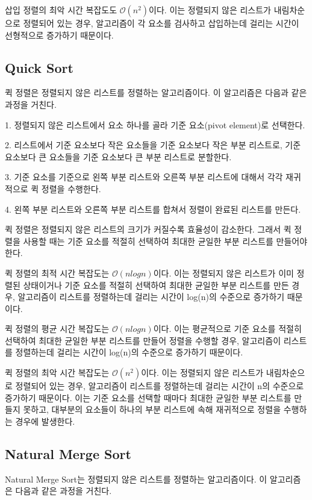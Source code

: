 \documentclass{article}
\begin{document}
삽입 정렬의 최악 시간 복잡도도 $\mathcal{O}(n^2)$이다. 이는 정렬되지 않은 리스트가 내림차순으로 정렬되어 있는 경우, 알고리즘이 각 요소를 검사하고 삽입하는데 걸리는 시간이 선형적으로 증가하기 때문이다.

\subsection{Quick Sort}
퀵 정렬은 정렬되지 않은 리스트를 정렬하는 알고리즘이다. 이 알고리즘은 다음과 같은 과정을 거친다.

1. 정렬되지 않은 리스트에서 요소 하나를 골라 기준 요소(pivot element)로 선택한다.

2. 리스트에서 기준 요소보다 작은 요소들을 기준 요소보다 작은 부분 리스트로, 기준 요소보다 큰 요소들을 기준 요소보다 큰 부분 리스트로 분할한다.

3. 기준 요소를 기준으로 왼쪽 부분 리스트와 오른쪽 부분 리스트에 대해서 각각 재귀적으로 퀵 정렬을 수행한다.

4. 왼쪽 부분 리스트와 오른쪽 부분 리스트를 합쳐서 정렬이 완료된 리스트를 만든다.

퀵 정렬은 정렬되지 않은 리스트의 크기가 커질수록 효율성이 감소한다. 그래서 퀵 정렬을 사용할 때는 기준 요소를 적절히 선택하여 최대한 균일한 부분 리스트를 만들어야 한다.

퀵 정렬의 최적 시간 복잡도는 $\mathcal{O}(nlogn)$이다. 이는 정렬되지 않은 리스트가 이미 정렬된 상태이거나 기준 요소를 적절히 선택하여 최대한 균일한 부분 리스트를 만든 경우, 알고리즘이 리스트를 정렬하는데 걸리는 시간이 log(n)의 수준으로 증가하기 때문이다.

퀵 정렬의 평균 시간 복잡도는 $\mathcal{O}(nlogn)$이다. 이는 평균적으로 기준 요소를 적절히 선택하여 최대한 균일한 부분 리스트를 만들어 정렬을 수행할 경우, 알고리즘이 리스트를 정렬하는데 걸리는 시간이 log(n)의 수준으로 증가하기 때문이다.

퀵 정렬의 최악 시간 복잡도는 $\mathcal{O}(n^2)$이다. 이는 정렬되지 않은 리스트가 내림차순으로 정렬되어 있는 경우, 알고리즘이 리스트를 정렬하는데 걸리는 시간이 n의 수준으로 증가하기 때문이다. 이는 기준 요소를 선택할 때마다 최대한 균일한 부분 리스트를 만들지 못하고, 대부분의 요소들이 하나의 부분 리스트에 속해 재귀적으로 정렬을 수행하는 경우에 발생한다.

\subsection{Natural Merge Sort}
Natural Merge Sort는 정렬되지 않은 리스트를 정렬하는 알고리즘이다. 이 알고리즘은 다음과 같은 과정을 거친다.
\end{document}
